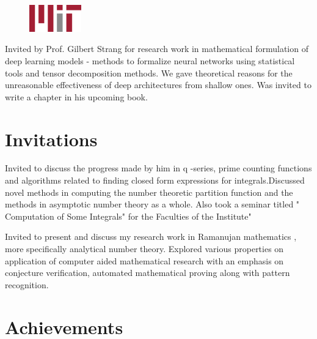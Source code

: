 \documentclass[]{deedy-resume-openfont}
\begin{document}
\begin{minipage}[t]{0.66\textwidth}
\begin{figure}
  \begin{center}
    \includegraphics[width=0.20\textwidth]{mitlogo.png}
  \end{center}
\end{figure}
Invited by Prof. Gilbert Strang for research work in mathematical formulation of deep learning models - methods to formalize neural networks using statistical tools and tensor decomposition methods. We gave theoretical reasons for the unreasonable effectiveness of deep architectures from shallow ones. Was invited to write a chapter in his upcoming book.
\sectionsep
\end{minipage} 


\section{Invitations}

Invited to discuss the progress made by him in q -series, prime counting functions and algorithms related to finding closed form expressions for integrals.Discussed novel methods in computing the number theoretic partition function and the methods in asymptotic  number theory as a whole. Also took a seminar titled " Computation of Some Integrals" for the Faculties of the Institute" \newline
\sectionsep


Invited to present and discuss my research work in Ramanujan mathematics , more specifically analytical number theory. Explored various properties on application of computer aided mathematical research with an emphasis on conjecture verification, automated mathematical proving along with pattern recognition.
\sectionsep



\section{Achievements}
\end{document}
